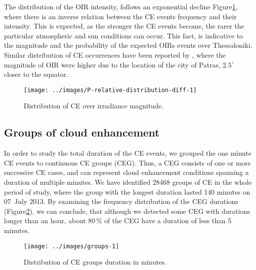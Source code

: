 \documentclass[preprint, 5p,
authoryear]{elsarticle} %
\begin{document}
The distribution of the OIR intensity, follows an exponential decline
Figure\nobreakspace{}\ref{fig:ovir-distribution}, where there is an
inverse relation between the CE events frequency and their intensity.
This is expected, as the stronger the CE events become, the rarer the
particular atmospheric and sun conditions can occur. This fact, is
indicative to the magnitude and the probability of the expected OIRs
events over Thessaloniki. Similar distribution of CE occurrences have
been reported by \citet{Vamvakas2020}, where the magnitude of OIR were
higher due to the location of the city of Patras, \(2.5^\circ\) closer
to the equator.

\begin{figure}

{\centering \texttt{[image: ../images/P-relative-distribution-diff-1]} 

}

\caption{Distribution of CE over irradiance magnitude.}\label{fig:ovir-distribution}
\end{figure}

\hypertarget{groups-of-cloud-enhancement}{%
\subsection{Groups of cloud
enhancement}\label{groups-of-cloud-enhancement}}

In order to study the total duration of the CE events, we grouped the
one minute CE events to continuous CE groups (CEG). Thus, a CEG consists
of one or more successive CE cases, and can represent cloud enhancement
conditions spanning a duration of multiple minutes. We have identified
28468 groups of CE in the whole period of study, where the group with
the longest duration lasted 140 minutes on 07~July 2013. By examining
the frequency distribution of the CEG durations
(Figure\nobreakspace{}\ref{fig:ceg-duration-distribution}), we can
conclude, that although we detected some CEG with durations longer than
an hour, about \(80\,\%\) of the CEG have a duration of less than 5
minutes.

\begin{figure}

{\centering \texttt{[image: ../images/groups-1]} 

}

\caption{Distribution of CE groups duration in minutes.}\label{fig:ceg-duration-distribution}
\end{figure}
\end{document}
